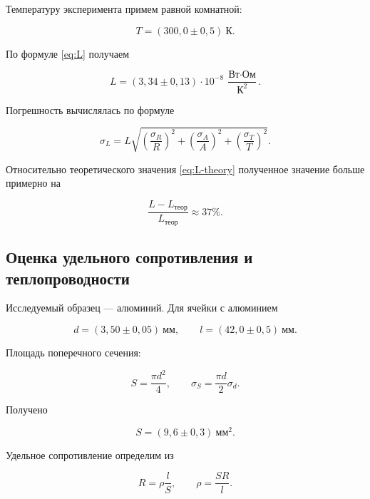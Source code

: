\documentclass[a4paper,12pt]{article}
\begin{document}
Температуру эксперимента примем равной комнатной:

\begin{equation}
    T = (300{,}0 \pm 0{,}5)~\text{К}.
\end{equation}

По формуле \eqref{eq:L} получаем

\begin{equation}
    L = (3{,}34 \pm 0{,}13)\cdot 10^{-8}~
    \frac{\text{Вт}\cdot\text{Ом}}{\text{К}^2}.
\end{equation}

Погрешность вычислялась по формуле

\begin{equation}
    \sigma_L = L \sqrt{
        \left(\frac{\sigma_R}{R}\right)^2 +
        \left(\frac{\sigma_A}{A}\right)^2 +
        \left(\frac{\sigma_T}{T}\right)^2
    }.
\end{equation}

Относительно теоретического значения \eqref{eq:L-theory} полученное значение больше примерно на

\begin{equation}
    \frac{L - L_{\text{теор}}}{L_{\text{теор}}} \approx 37\%.
\end{equation}

\subsection*{Оценка удельного сопротивления и теплопроводности}

Исследуемый образец --- алюминий. Для ячейки с алюминием

\begin{equation}
    d = (3{,}50 \pm 0{,}05)~\text{мм}, \qquad
    l = (42{,}0 \pm 0{,}5)~\text{мм}.
\end{equation}

Площадь поперечного сечения:

\begin{equation}
    S = \frac{\pi d^2}{4}, \qquad
    \sigma_S = \frac{\pi d}{2}\sigma_d.
\end{equation}

Получено

\begin{equation}
    S = (9{,}6 \pm 0{,}3)~\text{мм}^2.
\end{equation}

Удельное сопротивление определим из

\begin{equation}
    R = \rho \frac{l}{S}, \qquad
    \rho = \frac{SR}{l}.
\end{equation}
\end{document}
